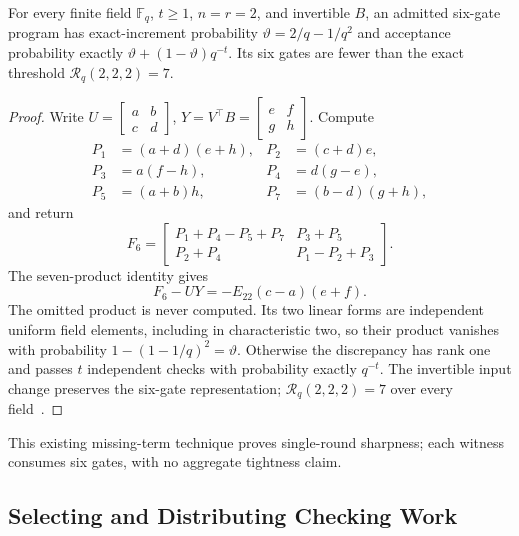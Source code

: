 \begin{theorem}
\label{ext:thm-sharpness}
For every finite field $\mathbb F_q$, $t\ge1$, $n=r=2$, and invertible
$B$, an admitted six-gate program has exact-increment probability
$\vartheta=2/q-1/q^2$ and acceptance probability exactly
$\vartheta+(1-\vartheta)q^{-t}$. Its six gates are fewer than the exact
threshold $\mathcal R_q(2,2,2)=7$.
\end{theorem}

\begin{proof}
Write $U=\left[\begin{smallmatrix}a&b\\c&d\end{smallmatrix}\right]$,
$Y=V^\top B=\left[\begin{smallmatrix}e&f\\g&h\end{smallmatrix}\right]$.
Compute
\[
\begin{aligned}
P_1&=(a+d)(e+h),&P_2&=(c+d)e,\\
P_3&=a(f-h),&P_4&=d(g-e),\\
P_5&=(a+b)h,&P_7&=(b-d)(g+h),
\end{aligned}
\]
and return
\[
F_6=\begin{bmatrix}
P_1+P_4-P_5+P_7&P_3+P_5\\
P_2+P_4&P_1-P_2+P_3
\end{bmatrix}.
\]
The seven-product identity gives
\begin{equation}
F_6-UY=-E_{22}(c-a)(e+f).
\label{ext:eq-missing-product}
\end{equation}
The omitted product is never computed. Its two linear forms are independent
uniform field elements, including in characteristic two, so their product
vanishes with probability $1-(1-1/q)^2=\vartheta$. Otherwise the discrepancy
has rank one and passes $t$ independent checks with probability exactly
$q^{-t}$. The invertible input change preserves the six-gate representation;
$\mathcal R_q(2,2,2)=7$ over every field~\cite{BlaserChristandlZuiddam2017}.
\end{proof}

This existing missing-term technique proves single-round sharpness;
each witness consumes six gates, with no aggregate tightness claim.

\subsection{Selecting and Distributing Checking Work}
\label{ext:sec-checking-design}


